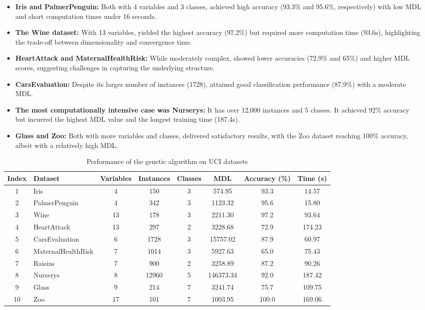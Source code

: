 \documentclass[runningheads]{llncs}
\begin{document}
\begin{itemize}
	\item \textbf{Iris and PalmerPenguin:} Both with 4 variables and 3 classes, achieved high accuracy (93.3\% and 95.6\%, respectively) with low MDL and short computation times under 16 seconds.
	\item \textbf{The Wine dataset:} With 13 variables, yielded the highest accuracy (97.2\%) but required more computation time (93.6s), highlighting the trade-off between dimensionality and convergence time.
	\item \textbf{HeartAttack and MaternalHealthRisk:} While moderately complex, showed lower accuracies (72.9\% and 65\%) and higher MDL scores, suggesting challenges in capturing the underlying structure.
	\item \textbf{CarsEvaluation:} Despite its larger number of instances (1728), attained good classification performance (87.9\%) with a moderate MDL.
	\item \textbf{The most computationally intensive case was Nurserys:} It has over 12,000 instances and 5 classes. It achieved 92\% accuracy but incurred the highest MDL value and the longest training time (187.4s).
	\item \textbf{Glass and Zoo:} Both with more variables and classes, delivered satisfactory results, with the Zoo dataset reaching 100\% accuracy, albeit with a relatively high MDL.
\end{itemize}

\begin{table}[htbp]
	\centering
	\caption{Performance of the genetic algorithm on UCI datasets}
	\begin{tabular}{|c|l|c|c|c|c|c|c|}
		\hline
		\textbf{Index} & \textbf{Dataset} & \textbf{Variables} & \textbf{Instances} & \textbf{Classes} & \textbf{MDL} & \textbf{Accuracy (\%)} & \textbf{Time (s)} \\
		\hline
		1  & Iris                & 4  & 150   & 3 & 574.95      & 93.3 & 14.57  \\
		2  & PalmerPenguin       & 4  & 342   & 3 & 1123.32     & 95.6 & 15.80  \\
		3  & Wine                & 13 & 178   & 3 & 2211.30     & 97.2 & 93.64  \\
		4  & HeartAttack         & 13 & 297   & 2 & 3228.68     & 72.9 & 174.23 \\
		5  & CarsEvaluation      & 6  & 1728  & 3 & 15757.02    & 87.9 & 60.97  \\
		6  & MaternalHealthRisk  & 7  & 1014  & 3 & 5927.63     & 65.0 & 75.43  \\
		7  & Raisins             & 7  & 900   & 2 & 3258.89     & 87.2 & 90.26  \\
		8  & Nurserys            & 8  & 12960 & 5 & 146373.34   & 92.0 & 187.42 \\
		9  & Glass               & 9  & 214   & 7 & 3241.74     & 75.7 & 109.75 \\
		10 & Zoo                 & 17 & 101   & 7 & 1003.95     & 100.0& 169.06 \\
		\hline
	\end{tabular}
	\label{tab:uci_results}
\end{table}
\end{document}
